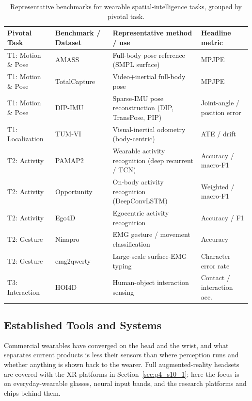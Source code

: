\begin{table}[!th]
\centering
\caption{Representative benchmarks for wearable spatial-intelligence tasks, grouped by pivotal task.}
\label{tab:p4_s9_3_benchmarks}
\fontsize{8}{10}\selectfont
\setlength{\tabcolsep}{1.0mm}
\begin{tabular}{L{0.16\textwidth} L{0.20\textwidth} L{0.34\textwidth} L{0.21\textwidth}}
\toprule
\textbf{Pivotal Task} & \textbf{Benchmark / Dataset} & \textbf{Representative method / use} & \textbf{Headline metric} \\
\midrule
T1: Motion \& Pose & AMASS~\cite{mahmood2019amass} & Full-body pose reference (SMPL surface) & MPJPE \\
T1: Motion \& Pose & TotalCapture~\cite{trumble2017totalcapture} & Video+inertial full-body pose & MPJPE \\
T1: Motion \& Pose & DIP-IMU~\cite{huang2018dip} & Sparse-IMU pose reconstruction (DIP, TransPose, PIP) & Joint-angle / position error \\
T1: Localization & TUM-VI~\cite{Schubert2018TUMVI} & Visual-inertial odometry (body-centric) & ATE / drift \\
T2: Activity & PAMAP2~\cite{reiss2012pamap2} & Wearable activity recognition (deep recurrent / TCN) & Accuracy / macro-F1 \\
T2: Activity & Opportunity~\cite{chavarriaga2013opportunity} & On-body activity recognition (DeepConvLSTM) & Weighted / macro-F1 \\
T2: Activity & Ego4D~\cite{grauman2022ego4d} & Egocentric activity recognition & Accuracy / F1 \\
T2: Gesture & Ninapro~\cite{atzori2014ninapro} & EMG gesture / movement classification & Accuracy \\
T2: Gesture & emg2qwerty~\cite{sivakumar2024emg2qwerty} & Large-scale surface-EMG typing & Character error rate \\
T3: Interaction & HOI4D~\cite{HOI4D} & Human-object interaction sensing & Contact / interaction acc. \\
\bottomrule
\end{tabular}
\end{table}


\subsection{Established Tools and Systems}
\label{subsec:p4-sec9-3-established-tools-and-systems}
Commercial wearables have converged on the head and the wrist, and what separates current products is less their sensors than where perception runs and whether anything is shown back to the wearer. Full augmented-reality headsets are covered with the XR platforms in Section~\ref{sec:p4_s10_1}; here the focus is on everyday-wearable glasses, neural input bands, and the research platforms and chips behind them.

